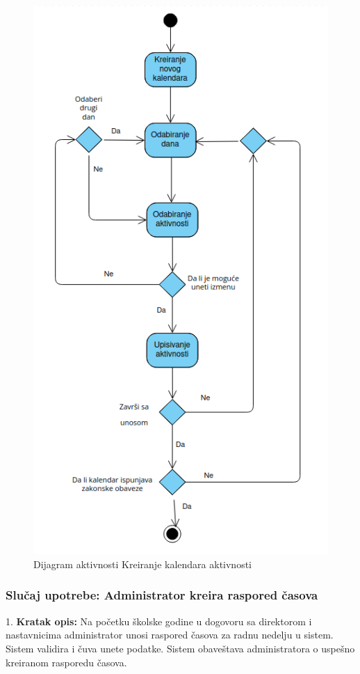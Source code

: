 \documentclass{article}
\begin{document}
\begin{figure} [!ht]
    \begin{center}
        \includegraphics[scale=0.35]{imgs/Dijagram_aktivnosti_administrator_kreira_kalendar.png}
    \end{center}
\caption{Dijagram aktivnosti Kreiranje kalendara aktivnosti}
\end{figure}


\newpage
\subsubsection{Slučaj upotrebe: Administrator kreira raspored časova}
1. \textbf{Kratak opis:} Na početku školske godine u dogovoru sa direktorom i nastavnicima administrator unosi raspored časova za radnu nedelju u sistem. Sistem validira i čuva unete podatke. Sistem obaveštava administratora o uspešno kreiranom rasporedu časova. \\ 
\end{document}
